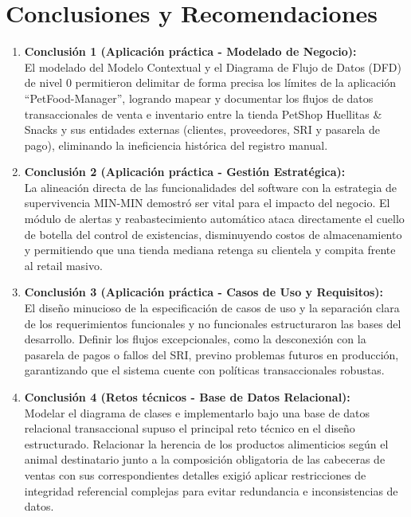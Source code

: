 \section{Conclusiones y Recomendaciones}
\begin{enumerate}
    \item \textbf{Conclusión 1 (Aplicación práctica - Modelado de Negocio):} \\
    El modelado del Modelo Contextual y el Diagrama de Flujo de Datos (DFD) de nivel 0 permitieron delimitar de forma precisa los límites de la aplicación ``PetFood-Manager'', logrando mapear y documentar los flujos de datos transaccionales de venta e inventario entre la tienda PetShop Huellitas \& Snacks y sus entidades externas (clientes, proveedores, SRI y pasarela de pago), eliminando la ineficiencia histórica del registro manual.
    
    \item \textbf{Conclusión 2 (Aplicación práctica - Gestión Estratégica):} \\
    La alineación directa de las funcionalidades del software con la estrategia de supervivencia MIN-MIN demostró ser vital para el impacto del negocio. El módulo de alertas y reabastecimiento automático ataca directamente el cuello de botella del control de existencias, disminuyendo costos de almacenamiento y permitiendo que una tienda mediana retenga su clientela y compita frente al retail masivo.
    
    \item \textbf{Conclusión 3 (Aplicación práctica - Casos de Uso y Requisitos):} \\
    El diseño minucioso de la especificación de casos de uso y la separación clara de los requerimientos funcionales y no funcionales estructuraron las bases del desarrollo. Definir los flujos excepcionales, como la desconexión con la pasarela de pagos o fallos del SRI, previno problemas futuros en producción, garantizando que el sistema cuente con políticas transaccionales robustas.
    
    \item \textbf{Conclusión 4 (Retos técnicos - Base de Datos Relacional):} \\
    Modelar el diagrama de clases e implementarlo bajo una base de datos relacional transaccional supuso el principal reto técnico en el diseño estructurado. Relacionar la herencia de los productos alimenticios según el animal destinatario junto a la composición obligatoria de las cabeceras de ventas con sus correspondientes detalles exigió aplicar restricciones de integridad referencial complejas para evitar redundancia e inconsistencias de datos.
    

\end{enumerate}
